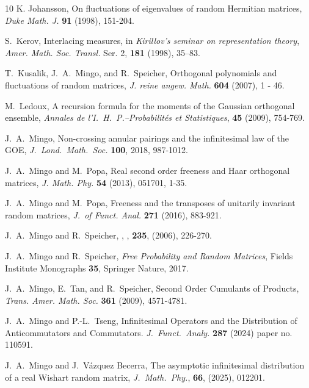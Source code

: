\documentclass[11pt]{amsart}
\theoremstyle{definition}
\numberwithin{theorem}{section}
\begin{document}
\begin{thebibliography}{10}
 K. Johansson, On fluctuations of eigenvalues of
  random Hermitian matrices, \textit{Duke Math. J.}
  \textbf{91} (1998), 151-204.
   
 S.~Kerov, Interlacing measures, in
  \textit{Kirillov’s seminar on representation theory},
  \textit{Amer.  Math. Soc. Transl.} Ser. 2, \textbf{181}
  (1998), 35–83.

 T.~Kusalik, J.~A.~Mingo, and R.~Speicher,
  Orthogonal polynomials and fluctuations of random
  matrices, \textit{J. reine angew. Math.} \textbf{604}
  (2007), 1 - 46.
  
 M.~Ledoux, A recursion formula for the moments
  of the Gaussian orthogonal ensemble, \textit{Annales de
    l'I.~H.~P.--Probabilit\'es et Statistiques},
  \textbf{45} (2009), 754-769.

 J.~A.~Mingo, Non-crossing annular pairings and
  the infinitesimal law of the GOE,
  \textit{J.~Lond.~Math.~Soc.} \textbf{100}, 2018, 987-1012.

 J.~A.~Mingo and M.~Popa, Real second order
  freeness and Haar orthogonal matrices,
  \textit{J. Math. Phy.} \textbf{54} (2013), 051701, 1-35.

 J.~A.~Mingo and M.~Popa, Freeness and the
  transposes of unitarily invariant random matrices,
  \textit{J.~of Funct. Anal.} \textbf{271} (2016), 883-921.

 J.~A.~Mingo and R.~Speicher, ,
  , {\bf 235}, (2006),
  226-270.

 J.~A.~Mingo and R.~Speicher, \textit{Free
  Probability and Random Matrices}, Fields Institute
  Monographs \textbf{35}, Springer Nature, 2017.
  
 J.~A.~Mingo, E.~Tan, and R.~Speicher, Second
  Order Cumulants of Products,
  \textit{Trans. Amer. Math. Soc.} \textbf{361} (2009),
  4571-4781.

 J.~A.~Mingo and P.-L.~Tseng, Infinitesimal
  Operators and the Distribution of Anticommutators and
  Commutators. \textit{J.~Funct.~Analy.} \textbf{287} (2024)
  paper no. 110591.

 J.~A.~Mingo and J.~Vázquez Becerra, The
  asymptotic infinitesimal distribution of a real Wishart
  random matrix, \textit{J.~Math.~Phy.}, \textbf{66},
  (2025), 012201.


\end{thebibliography}
\end{document}
